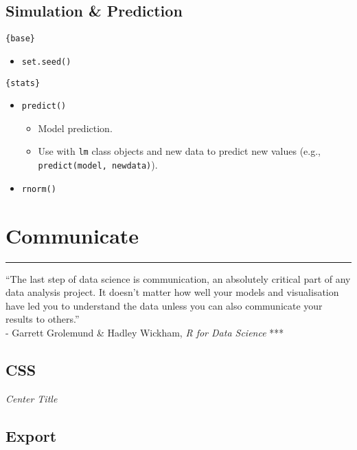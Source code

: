 \documentclass[
]{book}
\providecommand{\tightlist}{%
  \setlength{\itemsep}{0pt}\setlength{\parskip}{0pt}}
\begin{document}
\hypertarget{simulation-prediction}{%
\section{Simulation \& Prediction}\label{simulation-prediction}}

\texttt{\{base\}}

\begin{itemize}
\tightlist
\item
  \texttt{set.seed()}
\end{itemize}

\texttt{\{stats\}}

\begin{itemize}
\tightlist
\item
  \texttt{predict()}

  \begin{itemize}
  \tightlist
  \item
    Model prediction.
  \item
    Use with \texttt{lm} class objects and new data to predict new values (e.g., \texttt{predict(model,\ newdata)}).
  \end{itemize}
\item
  \texttt{rnorm()}
\end{itemize}

\hypertarget{communicate}{%
\chapter{Communicate}\label{communicate}}

\begin{center}\rule{0.5\linewidth}{0.5pt}\end{center}

``The last step of data science is communication, an absolutely critical part of any data analysis project. It doesn't matter how well your models and visualisation have led you to understand the data unless you can also communicate your results to others.''\\
- Garrett Grolemund \& Hadley Wickham, \emph{R for Data Science}
***

\hypertarget{css}{%
\section{CSS}\label{css}}

\emph{Center Title}

\hypertarget{export}{%
\section{Export}\label{export}}
\end{document}
